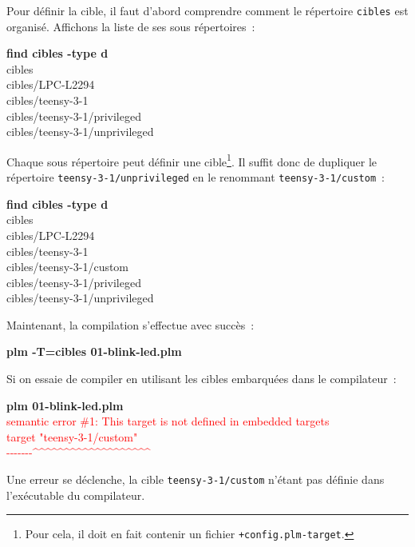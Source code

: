 Pour définir la cible, il faut d'abord comprendre comment le répertoire \texttt{cibles} est organisé. Affichons la liste de ses sous répertoires~:
\begin{SHELL}
{\bfseries find cibles -type d}\\
cibles\\
cibles/LPC-L2294\\
cibles/teensy-3-1\\
cibles/teensy-3-1/privileged\\
cibles/teensy-3-1/unprivileged
\end{SHELL}

Chaque sous répertoire peut définir une cible\footnote{Pour cela, il doit en fait contenir un fichier \texttt{+config.plm-target}.}. Il suffit donc de dupliquer le répertoire \texttt{teensy-3-1/unprivileged} en le renommant \texttt{teensy-3-1/custom}~:
\begin{SHELL}
{\bfseries find cibles -type d}\\
cibles\\
cibles/LPC-L2294\\
cibles/teensy-3-1\\
cibles/teensy-3-1/custom\\
cibles/teensy-3-1/privileged\\
cibles/teensy-3-1/unprivileged
\end{SHELL}

Maintenant, la compilation s'effectue avec succès~:
\begin{SHELL}
{\bfseries plm -T=cibles 01-blink-led.plm}
\end{SHELL}

Si on essaie de compiler en utilisant les cibles embarquées dans le compilateur~:
\begin{SHELL}
{\bfseries plm 01-blink-led.plm}\\
\textcolor{red}{semantic error \#1: This target is not defined in embedded targets}\\
\textcolor{red}{target "teensy-3-1/custom"}\\
\textcolor{red}{-{}-{}-{}-{}-{}-{}-\^{}\^{}\^{}\^{}\^{}\^{}\^{}\^{}\^{}\^{}\^{}\^{}\^{}\^{}\^{}\^{}\^{}\^{}\^{}}
\end{SHELL}

Une erreur se déclenche, la cible \texttt{teensy-3-1/custom} n'étant pas définie dans l'exécutable du compilateur.







